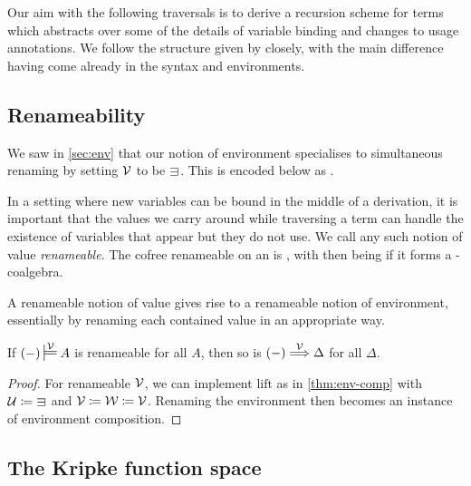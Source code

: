 Our aim with the following traversals is to derive a recursion scheme for
terms which abstracts over some of the details of variable binding and
changes to usage annotations.
We follow the structure given by \citet{AACMM20} closely, with
the main difference having come already in the syntax and environments.

\subsection{Renameability}

We saw in \cref{sec:env} that our notion of environment specialises to
simultaneous renaming by setting $\mathcal V$ to be $\sqni$.
This is encoded below as
.


In a setting where new variables can be bound in the middle of a derivation,
it is important that the values we carry around while traversing a term can
handle the existence of variables that appear but they do not use.
We call any such notion of value \emph{renameable}.
The cofree renameable  on an 
 is \AgdaSpace{}, with
 then being  if it forms a
-coalgebra.


A renameable notion of value gives rise to a renameable notion of environment,
essentially by renaming each contained value in an appropriate way.

\begin{lemma}\label{thm:env-ren}
  If $\plr{-} \sdtstile{}\V A$ is renameable for all $A$, then so is
  $\plr{-} \env\V \Delta$ for all $\Delta$.
\end{lemma}
\begin{proof}
  For renameable $\mathcal V$, we can implement $\mathrm{lift}$ as in
  \cref{thm:env-comp} with $\U \coloneqq {\sqni}$ and
  $\mathcal V \coloneqq \mathcal W \coloneqq \mathcal V$.
  Renaming the environment then becomes an instance of environment composition.
\end{proof}

\subsection{The Kripke function space}

